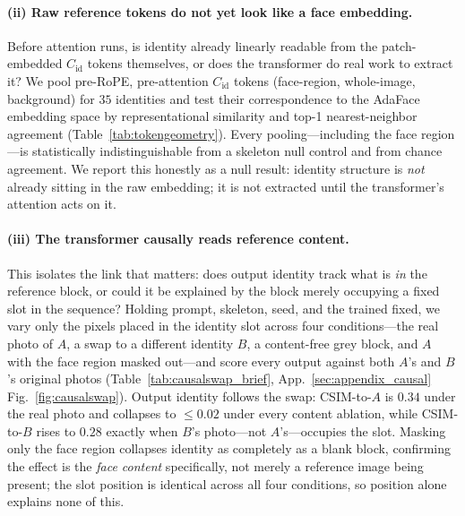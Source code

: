 \paragraph{(ii) Raw reference tokens do not yet look like a face embedding.}
Before attention runs, is identity already linearly readable from the
patch-embedded $C_{\mathrm{id}}$ tokens themselves, or does the transformer do
real work to extract it? We pool pre-RoPE, pre-attention $C_{\mathrm{id}}$
tokens (face-region, whole-image, background) for $35$ identities and test
their correspondence to the AdaFace embedding space by representational
similarity and top-1 nearest-neighbor agreement (Table~\ref{tab:tokengeometry}).
Every pooling---including the face region---is statistically indistinguishable
from a skeleton null control and from chance agreement. We report this
honestly as a null result: identity structure is \emph{not} already sitting in
the raw embedding; it is not extracted until the transformer's attention acts
on it.

\paragraph{(iii) The transformer causally reads reference content.} This
isolates the link that matters: does output identity track what is \emph{in}
the reference block, or could it be explained by the block merely occupying a
fixed slot in the sequence? Holding prompt, skeleton, seed, and the trained
\gate{} fixed, we vary only the pixels placed in the identity slot across four
conditions---the real photo of $A$, a swap to a different identity $B$, a
content-free grey block, and $A$ with the face region masked out---and score
every output against both $A$'s and $B$'s original photos
(Table~\ref{tab:causalswap_brief}, App.~\ref{sec:appendix_causal} Fig.~\ref{fig:causalswap}). Output identity
follows the swap: CSIM-to-$A$ is $0.34$ under the real photo and collapses to
$\leq\!0.02$ under every content ablation, while CSIM-to-$B$ rises to $0.28$
exactly when $B$'s photo---not $A$'s---occupies the slot. Masking only the
face region collapses identity as completely as a blank block, confirming the
effect is the \emph{face content} specifically, not merely a reference image
being present; the slot position is identical across all four conditions, so
position alone explains none of this.

